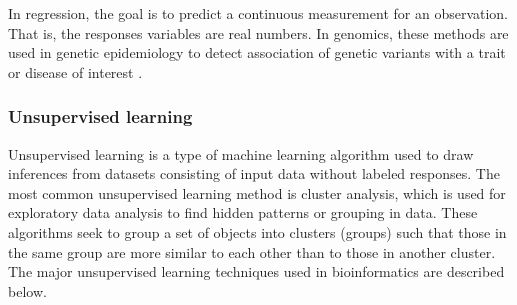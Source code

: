 In regression, the goal is to predict a continuous measurement for an observation. That is, the responses variables are real numbers. In genomics, these methods are  used in genetic epidemiology to detect association of genetic variants with a trait or disease of interest \cite{dasgupta2011brief}.




\subsubsection{Unsupervised learning}


Unsupervised learning is a type of machine learning algorithm used to draw inferences from datasets consisting of input data without labeled responses.
The most common unsupervised learning method is cluster analysis, which is used for exploratory data analysis to find hidden patterns or grouping in data. These algorithms seek to group a set of objects into clusters (groups)
such that those in the same group are more similar to each other than to those in another cluster.
The major unsupervised learning techniques used in bioinformatics are described below.
